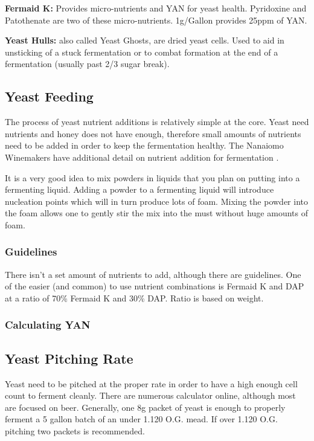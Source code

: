 \documentclass{article}
\begin{document}
  \textbf{Fermaid K:} Provides micro-nutrients and YAN for yeast health. Pyridoxine and Patothenate are two of these micro-nutrients. 
  1g/Gallon provides 25ppm of YAN.

  \textbf{Yeast Hulls:} also called Yeast Ghosts, are dried yeast cells. Used to aid in unsticking of a stuck fermentation or to combat 
   formation at the end of a fermentation (usually past 2/3 sugar break).
  
 \subsection{Yeast Feeding}
  The process of yeast nutrient additions is relatively simple at the core. Yeast need nutrients and honey does not have enough, therefore small amounts
  of nutrients need to be added in order to keep the fermentation healthy. The Nanaiomo Winemakers have additional detail on nutrient addition for fermentation
  \cite{nanaiomo-fermentation}. 

  It is a very good idea to mix powders in liquids that you plan on putting into a fermenting liquid. Adding a powder to a fermenting liquid will introduce nucleation
  points which will in turn produce lots of foam. Mixing the powder into the foam allows one to gently stir the mix into the must without huge amounts of foam.
  \subsubsection{Guidelines}
   There isn't a set amount of nutrients to add, although there are guidelines. One of the easier (and common) to use nutrient 
   combinations is Fermaid K and DAP at a ratio of 70\% Fermaid K and 30\% DAP\cite{gotmead-fermaid-ratio}. Ratio is based on weight. 

  \subsubsection{Calculating YAN}

 \subsection{Yeast Pitching Rate}
  Yeast need to be pitched at the proper rate in order to have a high enough cell count to ferment cleanly. There are numerous calculator online, although most
  are focused on beer. Generally, one 8g packet of yeast is enough to properly ferment a 5 gallon batch of an under 1.120 O.G. mead. If over 1.120 O.G. pitching
  two packets is recommended. 
\end{document}
